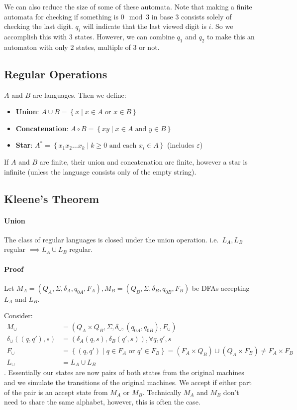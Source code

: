 \documentclass[12 pt]{article}
\begin{document}
We can also reduce the size of some of these automata. Note that
making a finite automata for checking if something is $0\mod 3$ in
base $3$ consists solely of checking the last digit. $q_i$ will
indicate that the last viewed digit is $i$. So we accomplish this with
$3$ states. However, we can combine $q_1$ and $q_2$ to make this an
automaton with only $2$ states, multiple of $3$ or not.
\subsection{Regular Operations}
$A$ and $B$ are languages. Then we define:
\begin{itemize}
\item \textbf{Union}: $A \cup B = \left\{x \mid x \in A \text{ or } x
    \in B\right\}$
\item \textbf{Concatenation}: $A \circ B = \left\{xy \mid x \in A
    \text{ and } y \in B\right\}$
\item \textbf{Star}: $A^* = \left\{x_1x_2\ldots x_k \mid k \geq 0
    \text{ and each }x_i \in A\right\}$ (includes $\varepsilon$)
\end{itemize}
If $A$ and $B$ are finite, their union and concatenation are finite,
however a star is infinite (unless the language consists only of the
empty string).

\subsection{Kleene's Theorem}
\paragraph{Union}
The class of regular languages is closed
under the union operation. i.e.\ $L_A, L_B$ regular $\implies L_A \cup
L_B$ regular.

\paragraph{Proof}
Let $M_A = (Q_A, \Sigma, \delta_A, q_{0A}, F_A),M_B = (Q_B, \Sigma,
\delta_B, q_{0B}, F_B)$ be DFAs accepting $L_A$ and $L_B$.

Consider:
\begin{align*}
M_{\cup} &= (Q_A \times Q_B, \Sigma, \delta_\cup, (q_{0A},
  q_{0B}), F_{\cup})
  \\ \delta_\cup((q,q'),s) &= (\delta_A(q,s),
  \delta_B(q',s)), \forall q,q',s
  \\ F_\cup & = \left\{(q,q') \mid q\in
  F_A \text{ or }q' \in F_B\right\} = (F_A \times Q_B) \cup (Q_A
  \times F_B) \neq F_A \times F_B
  \\L_\cup & = L_A \cup L_B
\end{align*}.
Essentially our states are now
pairs of both states from the original machines and we simulate the
transitions of the original machines. We accept if either part of the
pair is an accept state from $M_A$ or $M_B$. Technically $M_A$ and
$M_B$ don't need to share the same alphabet, however, this is often
the case.
\end{document}

